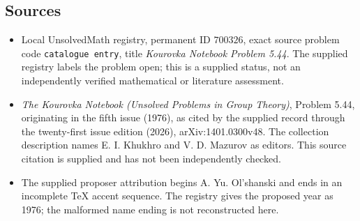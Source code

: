 \documentclass[11pt]{article}
\begin{document}
\subsection{Sources}
\begin{itemize}
\item Local UnsolvedMath registry, permanent ID \(700326\), exact source problem code \texttt{catalogue entry}, title \emph{Kourovka Notebook Problem 5.44}. The supplied registry labels the problem open; this is a supplied status, not an independently verified mathematical or literature assessment.
\item \emph{The Kourovka Notebook (Unsolved Problems in Group Theory)}, Problem 5.44, originating in the fifth issue (1976), as cited by the supplied record through the twenty-first issue edition (2026), arXiv:1401.0300v48. The collection description names E. I. Khukhro and V. D. Mazurov as editors. This source citation is supplied and has not been independently checked.
\item The supplied proposer attribution begins A. Yu. Ol'shanski and ends in an incomplete TeX accent sequence. The registry gives the proposed year as 1976; the malformed name ending is not reconstructed here.
\end{itemize}
\end{document}
